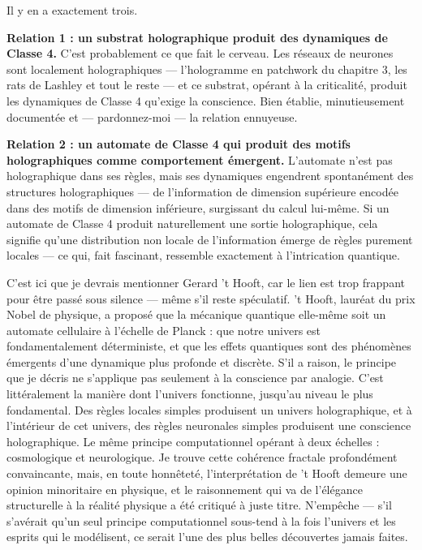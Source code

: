 \documentclass[11pt, twoside, openright]{book}
\begin{document}
Il y en a exactement trois.

\textbf{Relation 1 : un substrat holographique produit des dynamiques de Classe 4.} C'est probablement ce que fait le cerveau. Les réseaux de neurones sont localement holographiques --- l'hologramme en patchwork du chapitre 3, les rats de Lashley et tout le reste --- et ce substrat, opérant à la criticalité, produit les dynamiques de Classe 4 qu'exige la conscience. Bien établie, minutieusement documentée et --- pardonnez-moi --- la relation ennuyeuse.

\textbf{Relation 2 : un automate de Classe 4 qui produit des motifs holographiques comme comportement émergent.} L'automate n'est pas holographique dans ses règles, mais ses dynamiques engendrent spontanément des structures holographiques --- de l'information de dimension supérieure encodée dans des motifs de dimension inférieure, surgissant du calcul lui-même. Si un automate de Classe 4 produit naturellement une sortie holographique, cela signifie qu'une distribution non locale de l'information émerge de règles purement locales --- ce qui, fait fascinant, ressemble exactement à l'intrication quantique.

C'est ici que je devrais mentionner Gerard 't Hooft, car le lien est trop frappant pour être passé sous silence --- même s'il reste spéculatif. 't Hooft, lauréat du prix Nobel de physique, a proposé que la mécanique quantique elle-même soit un automate cellulaire à l'échelle de Planck : que notre univers est fondamentalement déterministe, et que les effets quantiques sont des phénomènes émergents d'une dynamique plus profonde et discrète. S'il a raison, le principe que je décris ne s'applique pas seulement à la conscience par analogie. C'est littéralement la manière dont l'univers fonctionne, jusqu'au niveau le plus fondamental. Des règles locales simples produisent un univers holographique, et à l'intérieur de cet univers, des règles neuronales simples produisent une conscience holographique. Le même principe computationnel opérant à deux échelles : cosmologique et neurologique. Je trouve cette cohérence fractale profondément convaincante, mais, en toute honnêteté, l'interprétation de 't Hooft demeure une opinion minoritaire en physique, et le raisonnement qui va de l'élégance structurelle à la réalité physique a été critiqué à juste titre. N'empêche --- s'il s'avérait qu'un seul principe computationnel sous-tend à la fois l'univers et les esprits qui le modélisent, ce serait l'une des plus belles découvertes jamais faites.
\end{document}
